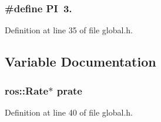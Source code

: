 \subsubsection[{\-P\-I}]{\setlength{\rightskip}{0pt plus 5cm}\#define {\bf \-P\-I}~3.}\label{global_8h_a598a3330b3c21701223ee0ca14316eca}


\-Definition at line 35 of file global.\-h.



\subsection{\-Variable \-Documentation}
\subsubsection[{prate}]{\setlength{\rightskip}{0pt plus 5cm}ros\-::\-Rate$\ast$ {\bf prate}}\label{global_8h_aa3a3dbf62694c2878585efa275514bbc}


\-Definition at line 40 of file global.\-h.

